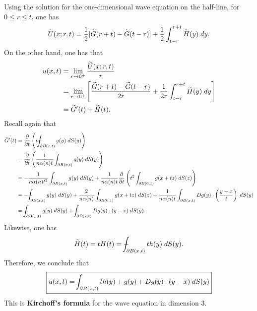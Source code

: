 \documentclass{article}
\def\Xint#1{\mathchoice
	{\XXint\displaystyle\textstyle{#1}}%
	{\XXint\textstyle\scriptstyle{#1}}%
	{\XXint\scriptstyle\scriptscriptstyle{#1}}%
	{\XXint\scriptscriptstyle\scriptscriptstyle{#1}}%
	\!\int}
\def\XXint#1#2#3{{\setbox0=\hbox{$#1{#2#3}{\int}$ }
		\vcenter{\hbox{$#2#3$ }}\kern-0.6\wd0}}
\def\dashint{\Xint-}
\numberwithin{equation}{section}
\begin{document}
	Using the solution for the one-dimensional wave equation on the half-line, for $0 \leq r \leq t$, one has 
	\begin{equation*}
		\widetilde{U}(x; r, t) = \frac{1}{2}[\widetilde{G}(r + t) - \widetilde{G}(t - r)] + \frac{1}{2}\int_{t -r}^{r + t}\widetilde{H}(y)\;dy. 
	\end{equation*}
	On the other hand, one has that 
	\begin{align*}
		\begin{split}
			u(x, t) &= \lim_{r \to 0^{+}}\frac{\widetilde{U}(x; r, t)}{r} \\
			&= \lim_{r \to 0^{+}}\left[\frac{\widetilde{G}(r + t) - \widetilde{G}(t - r)}{2r} + \frac{1}{2r}\int_{t - r}^{r + t}\widetilde{H}(y)\;dy\right] \\
			&= \widetilde{G}'(t) + \widetilde{H}(t). 
		\end{split}
	\end{align*}
	Recall again that 
	\begin{align}
		\begin{split}
			\ti{G}'(t) &= \frac{\partial}{\partial t}\left(t\dashint_{\partial B(x, t)}g(y)\;dS(y)\right) \\
			&= \frac{\partial}{\partial t}\left(\frac{1}{n\alpha(n)t}\int_{\partial B(x ,t)}g(y)\;dS(y)\right) \\
			&= -\frac{1}{n\alpha(n)t^{2}}\int_{\partial B(x,t)}g(y)\;dS(y) + \frac{1}{n\alpha(n)t}\frac{\partial}{\partial t}\left(t^{2}\int_{\partial B(0,1)}g(x + tz)\;dS(z)\right) \\
			&= -\dashint_{\partial B(x, t)}g(y)\;dS(y) + \frac{2}{n\alpha(n)}\int_{\partial B(0,1)}g(x + tz)\;dS(z) + \frac{1}{n\alpha(n)t}\int_{\partial B(x, t)}Dg(y) \cdot \left(\frac{y - x}{t}\right)\;dS(y) \\
			&= \dashint_{\partial B(x, t)}g(y)\;dS(y) + \dashint_{\partial B(x, t)}Dg(y) \cdot (y - x)\;dS(y). 
		\end{split}
	\end{align}
	Likewise, one has 
	\begin{equation*}
		\ti{H}(t) = tH(t) = \dashint_{\partial B(x, t)}th(y)\;dS(y). 
	\end{equation*}
	Therefore, we conclude that 
	\begin{equation}
		\boxed{u(x, t) = \dashint_{\partial B(x, t)}th(y) + g(y) + Dg(y) \cdot (y - x)\;dS(y)}\label{eq:Kirchoff}
	\end{equation}
	This is \textbf{Kirchoff's formula} for the wave equation in dimension 3.
	
\end{document}
